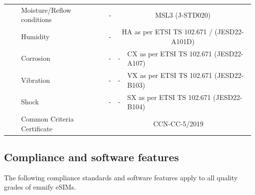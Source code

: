 \documentclass[11pt, oneside]{article}   	%
\begin{document}
\begin{table}[H]
{\begin{tabular}{|lll|ccl|}
\multicolumn{1}{|l|}{} & \multicolumn{1}{l|}{} & Moisture/Reflow conditions & \multicolumn{1}{c|}{-} & \multicolumn{2}{c|}{MSL3 (J-STD020)} \\ \cline{3-6} 
\multicolumn{1}{|l|}{} & \multicolumn{1}{l|}{} & Humidity & \multicolumn{1}{c|}{-} & \multicolumn{2}{c|}{HA as per ETSI TS 102.671 / (JESD22-A101D)} \\ \cline{3-6} 
\multicolumn{1}{|l|}{} & \multicolumn{1}{l|}{} & Corrosion & \multicolumn{1}{c|}{-} & \multicolumn{1}{c|}{-} & CX as per ETSI TS 102.671 (JESD22-A107) \\ \cline{3-6} 
\multicolumn{1}{|l|}{} & \multicolumn{1}{l|}{} & Vibration & \multicolumn{1}{c|}{-} & \multicolumn{1}{c|}{-} & VX as per ETSI TS 102.671 (JESD22-B103) \\ \cline{3-6} 
\multicolumn{1}{|l|}{} & \multicolumn{1}{l|}{} & Shock & \multicolumn{1}{c|}{-} & \multicolumn{1}{c|}{-} & SX as per ETSI TS 102.671 (JESD22-B104) \\ \cline{3-6} 
\multicolumn{1}{|l|}{} & \multicolumn{1}{l|}{} & Common Criteria Certificate & \multicolumn{3}{c|}{CCN-CC-5/2019} \\ \hline
\end{tabular}%
}
\end{table}

\subsection{Compliance and software features}

The following compliance standards and software features apply to all quality grades of emnify eSIMs.
\end{document}
